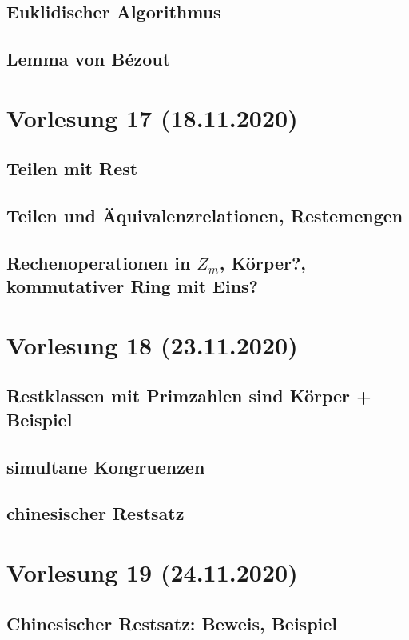 \documentclass[]{article}
\begin{document}
\subsection{Euklidischer Algorithmus}
\subsection{Lemma von Bézout}



\section{Vorlesung 17 (18.11.2020)}
\subsection{Teilen mit Rest}
\subsection{Teilen und Äquivalenzrelationen, Restemengen}
\subsection{Rechenoperationen in $Z_m$, Körper?, kommutativer Ring mit Eins?}


\section{Vorlesung 18 (23.11.2020)}
\subsection{Restklassen mit Primzahlen sind Körper + Beispiel}
\subsection{simultane Kongruenzen}
\subsection{chinesischer Restsatz}


\section*{Vorlesung 19 (24.11.2020)}
\subsection*{Chinesischer Restsatz: Beweis, Beispiel}
\end{document}

